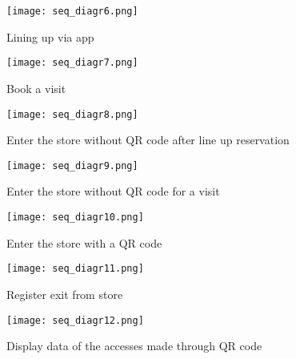 \begin{figure}
    \centering
    \texttt{[image: seq\_diagr6.png]}
    \caption{Lining up via app}
\end{figure}

\begin{figure}
    \centering
    \texttt{[image: seq\_diagr7.png]}
    \caption{Book a visit}
\end{figure}

\begin{figure}
    \centering
    \texttt{[image: seq\_diagr8.png]}
    \caption{Enter the store without QR code after line up reservation}
\end{figure}

\begin{figure}
    \centering
    \texttt{[image: seq\_diagr9.png]}
    \caption{Enter the store without QR code for a visit}
\end{figure}

\begin{figure}
    \centering
    \texttt{[image: seq\_diagr10.png]}
    \caption{Enter the store with a QR code}
\end{figure}

\begin{figure}
    \centering
    \texttt{[image: seq\_diagr11.png]}
    \caption{Register exit from store}
\end{figure}

\begin{figure}
    \centering
    \texttt{[image: seq\_diagr12.png]}
    \caption{Display data of the accesses made through QR code}
\end{figure}

\clearpage